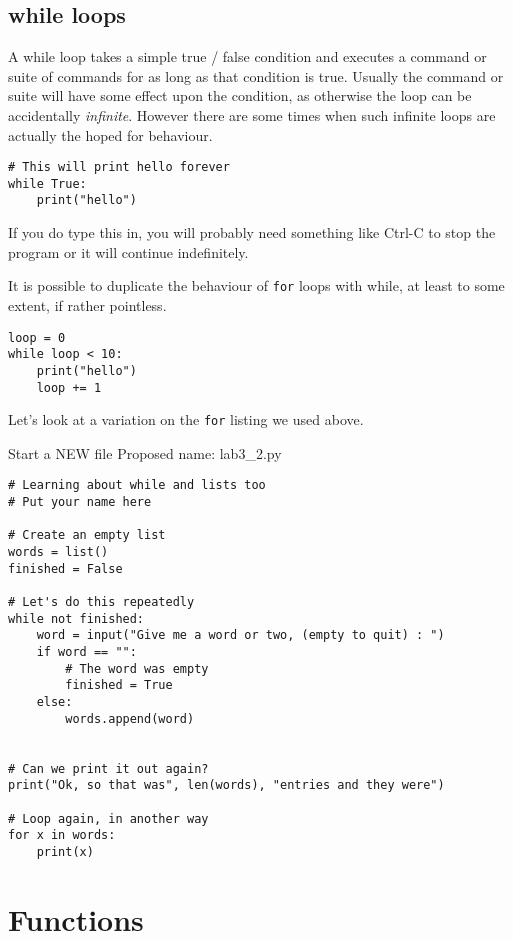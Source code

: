 \documentclass[12pt,oneside]{cttutorial}
\begin{document}
\subsection{while loops}

A while loop takes a simple true / false condition and executes a command or suite of commands for as long as that condition is true. Usually the command or suite will have some effect upon the condition, as otherwise the loop can be accidentally \emph{infinite}. However there are some times when such infinite loops are actually the hoped for behaviour.

\begin{lstlisting}
# This will print hello forever
while True:
    print("hello")
\end{lstlisting}

If you do type this in, you will probably need something like Ctrl-C to stop the program or it will continue indefinitely.

It is possible to duplicate the behaviour of \lstinline!for! loops with while, at least to some extent, if rather pointless.

\begin{lstlisting}
loop = 0
while loop < 10:
    print("hello")
    loop += 1
\end{lstlisting}

Let's look at a variation on the \lstinline!for! listing we used above.

\alert{Start a NEW file}
Proposed name: lab3\_2.py
\begin{lstlisting}
# Learning about while and lists too
# Put your name here

# Create an empty list
words = list()
finished = False

# Let's do this repeatedly
while not finished:
    word = input("Give me a word or two, (empty to quit) : ")
    if word == "":
        # The word was empty
        finished = True
    else:
        words.append(word)


# Can we print it out again?
print("Ok, so that was", len(words), "entries and they were")

# Loop again, in another way
for x in words:
    print(x)

\end{lstlisting}

\section{Functions}
\end{document}
